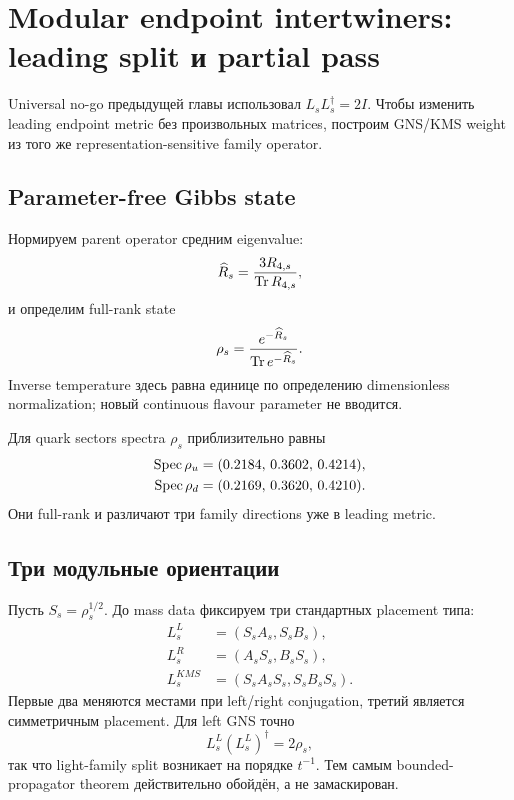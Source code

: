 \chapter{Modular endpoint intertwiners: leading split и partial pass}

Universal no-go предыдущей главы использовал
\(L_sL_s^\dagger=2I\). Чтобы изменить leading endpoint metric без
произвольных matrices, построим GNS/KMS weight из того же
representation-sensitive family operator.

\section{Parameter-free Gibbs state}

Нормируем parent operator средним eigenvalue:
\begin{equation}
 \widehat R_s=\frac{3R_{4,s}}{\operatorname{Tr} R_{4,s}},
\end{equation}
и определим full-rank state
\begin{equation}
 \rho_s=\frac{e^{-\widehat R_s}}{\operatorname{Tr} e^{-\widehat R_s}}.
\end{equation}
Inverse temperature здесь равна единице по определению dimensionless
normalization; новый continuous flavour parameter не вводится.

Для quark sectors spectra \(\rho_s\) приблизительно равны
\begin{align}
 \operatorname{Spec}\rho_u&=(0.2184,\,0.3602,\,0.4214),\\
 \operatorname{Spec}\rho_d&=(0.2169,\,0.3620,\,0.4210).
\end{align}
Они full-rank и различают три family directions уже в leading metric.

\section{Три модульные ориентации}

Пусть \(S_s=\rho_s^{1/2}\). До mass data фиксируем три стандартных placement
типа:
\begin{align}
 L_s^{L}&=(S_sA_s,S_sB_s),\\
 L_s^{R}&=(A_sS_s,B_sS_s),\\
 L_s^{KMS}&=(S_sA_sS_s,S_sB_sS_s).
\end{align}
Первые два меняются местами при left/right conjugation, третий является
симметричным placement. Для left GNS точно
\begin{equation}
 L_s^L(L_s^L)^\dagger=2\rho_s,
\end{equation}
так что light-family split возникает на порядке \(t^{-1}\). Тем самым
bounded-propagator theorem действительно обойдён, а не замаскирован.

